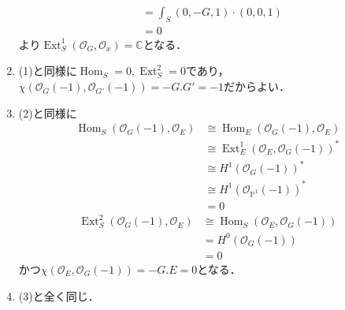 \documentclass[uplatex,a4paper,11pt,dvipdfmx]{jsarticle}
\makeatletter
\theoremstyle{mystyle} %
\renewenvironment{proof}[1][\proofname]{\par
 \pushQED{\qed}%
 \normalfont \topsep6\p@\@plus6\p@\relax
 \trivlist
 \item[\hskip\labelsep
 \itshape
 {\bf\underline{#1}}]\ignorespaces
}{%
 \popQED\endtrivlist\@endpefalse
}
\DeclareMathOperator{\Hom}{Hom}
\DeclareMathOperator{\Ext}{Ext}
\makeatother
\begin{document}
\begin{proof}
\begin{enumerate}
\begin{align*}
			                                         & =\int_S (0, -G, 1)\cdot(0, 0, 1)                                     \\
			                                         & =0
		      \end{align*}
		      より$\Ext^1_S(\mathcal{O}_G, \mathcal{O}_x) = \mathbb{C}$となる．
		\item (1)と同様に$\Hom_S=0, \Ext^2_S = 0$であり，$\chi(\mathcal{O}_G(-1), \mathcal{O}_{G'}(-1)) =-G.G' = -1$だからよい．
		\item (2)と同様に\begin{align*}
			      \Hom_S(\mathcal{O}_G(-1), \mathcal{O}_E) & \cong \Hom_E(\mathcal{O}_G(-1),\mathcal{O}_E)      \\
			                                               & \cong \Ext^1_E(\mathcal{O}_E, \mathcal{O}_G(-1))^* \\
			                                               & \cong H^1(\mathcal{O}_G(-1))^*                     \\
			                                               & \cong H^1(\mathcal{O}_{\mathbb{P}^1}(-1))^*        \\
			                                               & =0
		      \end{align*}
		      \begin{align*}
			      \Ext^2_S(\mathcal{O}_G(-1), \mathcal{O}_E) & \cong \Hom_S(\mathcal{O}_E, \mathcal{O}_G(-1)) \\
			                                                 & =H^0(\mathcal{O}_G(-1))                        \\
			                                                 & =0
		      \end{align*}
		      かつ$\chi(\mathcal{O}_E, \mathcal{O}_G(-1)) = -G.E = 0$となる．
		\item (3)と全く同じ．
	\end{enumerate}
\end{proof}
\end{document}
